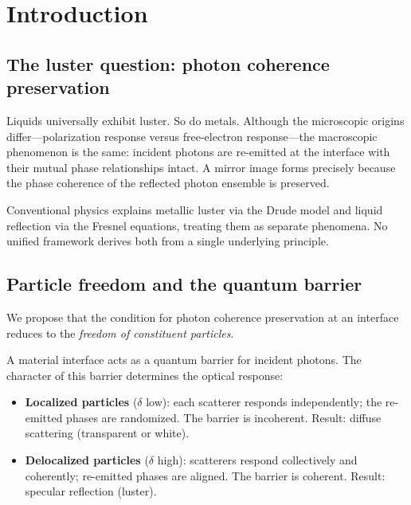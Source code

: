 \documentclass[twocolumn,showpacs,preprintnumbers,amsmath,amssymb,prb]{revtex4-2}
\begin{document}
\maketitle

\section{Introduction}

\subsection{The luster question: photon coherence preservation}

Liquids universally exhibit luster. So do metals. Although the microscopic
origins differ---polarization response versus free-electron response---the
macroscopic phenomenon is the same: incident photons are re-emitted at the
interface with their mutual phase relationships intact. A mirror image
forms precisely because the phase coherence of the reflected photon
ensemble is preserved.

Conventional physics explains metallic luster via the Drude model and
liquid reflection via the Fresnel equations, treating them as separate
phenomena. No unified framework derives both from a single underlying
principle.

\subsection{Particle freedom and the quantum barrier}

We propose that the condition for photon coherence preservation at an
interface reduces to the \emph{freedom of constituent particles}.

A material interface acts as a quantum barrier for incident photons. The
character of this barrier determines the optical response:

\begin{itemize}
  \item \textbf{Localized particles} ($\delta$ low): each scatterer
    responds independently; the re-emitted phases are randomized. The
    barrier is incoherent. Result: diffuse scattering (transparent or
    white).
  \item \textbf{Delocalized particles} ($\delta$ high): scatterers
    respond collectively and coherently; re-emitted phases are aligned.
    The barrier is coherent. Result: specular reflection (luster).
\end{itemize}
\end{document}
